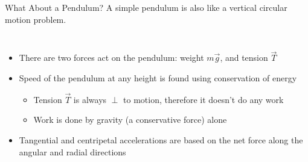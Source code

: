 \documentclass[12pt,compress,aspectratio=169]{beamer}
\begin{document}
\begin{frame}{What About a Pendulum?}
  A simple pendulum is also like a vertical circular motion problem.

  \vspace{.1in}\begin{columns}

    \begin{itemize}
    \item There are two forces act on the pendulum: weight $m\vec g$, and
    tension $\vec T$
    \item Speed of the pendulum at any height is found using conservation
      of energy
      \begin{itemize}
      \item Tension $\vec T$ is always $\perp$ to motion, therefore it doesn't
        do any work
      \item Work is done by gravity (a conservative force) alone
      \end{itemize}
    \item Tangential and centripetal accelerations are based on the net force
      along the angular and radial directions
    \end{itemize}
  \end{columns}
\end{frame}
\end{document}
